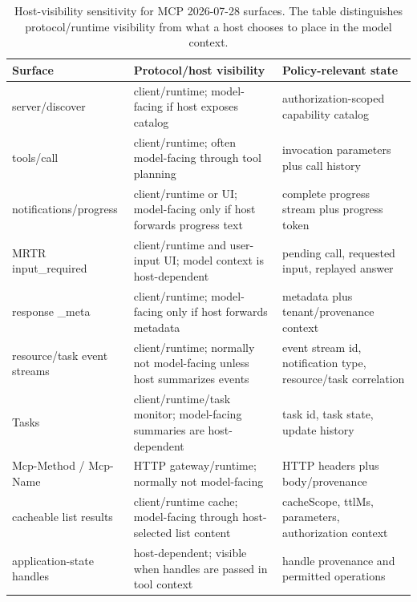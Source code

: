 \begin{table}[t]
  \caption{Host-visibility sensitivity for MCP 2026-07-28 surfaces. The
  table distinguishes protocol/runtime visibility from what a host chooses
  to place in the model context.}
  \label{tab:visibility}
  \centering\footnotesize
  \begin{tabular}{@{}p{}p{}p{}@{}}
    \toprule
    Surface & Protocol/host visibility & Policy-relevant state \\
    \midrule
    server/discover & client/runtime; model-facing if host exposes catalog & authorization-scoped capability catalog \\
    tools/call & client/runtime; often model-facing through tool planning & invocation parameters plus call history \\
    notifications/progress & client/runtime or UI; model-facing only if host forwards progress text & complete progress stream plus progress token \\
    MRTR input\_required & client/runtime and user-input UI; model context is host-dependent & pending call, requested input, replayed answer \\
    response \_meta & client/runtime; model-facing only if host forwards metadata & metadata plus tenant/provenance context \\
    resource/task event streams & client/runtime; normally not model-facing unless host summarizes events & event stream id, notification type, resource/task correlation \\
    Tasks & client/runtime/task monitor; model-facing summaries are host-dependent & task id, task state, update history \\
    Mcp-Method / Mcp-Name & HTTP gateway/runtime; normally not model-facing & HTTP headers plus body/provenance \\
    cacheable list results & client/runtime cache; model-facing through host-selected list content & cacheScope, ttlMs, parameters, authorization context \\
    application-state handles & host-dependent; visible when handles are passed in tool context & handle provenance and permitted operations \\
    \bottomrule
  \end{tabular}
\end{table}
